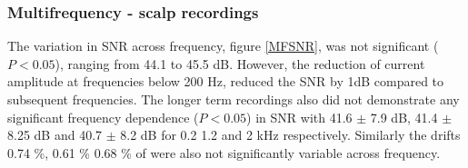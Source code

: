 \subsubsection{Multifrequency - scalp recordings}

The variation in SNR across frequency, figure \ref{MFSNR}, was not significant  ($P<0.05$), ranging from 44.1 to 45.5 dB.  However, the reduction of current amplitude at frequencies below 200 Hz, reduced the SNR by 1dB compared to subsequent frequencies. The longer term recordings also did not demonstrate any significant frequency dependence ($P<0.05$) in SNR with 41.6 $\pm$ 7.9 dB, 41.4 $\pm$ 8.25 dB and 40.7 $\pm$ 8.2 dB for 0.2 1.2 and 2 kHz respectively. Similarly the drifts 0.74 \%, 0.61 \% 0.68 \% of were also not significantly variable across frequency.